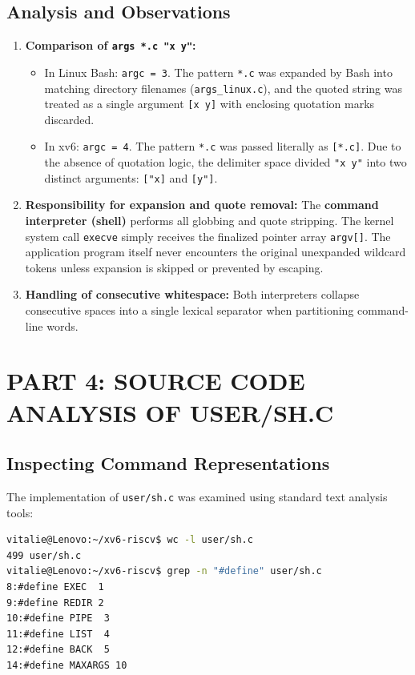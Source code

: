 \documentclass[12pt,a4paper]{report}
\numberwithin{equation}{chapter}
\numberwithin{figure}{chapter}
\numberwithin{table}{chapter}
\begin{document}
\section{Analysis and Observations}
\begin{enumerate}
    \item \textbf{Comparison of \texttt{args *.c "x y"}:}
    \begin{itemize}
        \item In Linux Bash: \texttt{argc = 3}. The pattern \texttt{*.c} was expanded by Bash into matching directory filenames (\texttt{args\_linux.c}), and the quoted string was treated as a single argument \texttt{[x y]} with enclosing quotation marks discarded.
        \item In xv6: \texttt{argc = 4}. The pattern \texttt{*.c} was passed literally as \texttt{[*.c]}. Due to the absence of quotation logic, the delimiter space divided \texttt{"x y"} into two distinct arguments: \texttt{["x]} and \texttt{[y"]}.
    \end{itemize}
    \item \textbf{Responsibility for expansion and quote removal:} The \textbf{command interpreter (shell)} performs all globbing and quote stripping. The kernel system call \texttt{execve} simply receives the finalized pointer array \texttt{argv[]}. The application program itself never encounters the original unexpanded wildcard tokens unless expansion is skipped or prevented by escaping.
    \item \textbf{Handling of consecutive whitespace:} Both interpreters collapse consecutive spaces into a single lexical separator when partitioning command-line words.
\end{enumerate}

\chapter{PART 4: SOURCE CODE ANALYSIS OF USER/SH.C}

\section{Inspecting Command Representations}
The implementation of \texttt{user/sh.c} was examined using standard text analysis tools:

\begin{lstlisting}[language=bash]
vitalie@Lenovo:~/xv6-riscv$ wc -l user/sh.c
499 user/sh.c
vitalie@Lenovo:~/xv6-riscv$ grep -n "#define" user/sh.c
8:#define EXEC  1
9:#define REDIR 2
10:#define PIPE  3
11:#define LIST  4
12:#define BACK  5
14:#define MAXARGS 10
\end{lstlisting}
\end{document}
